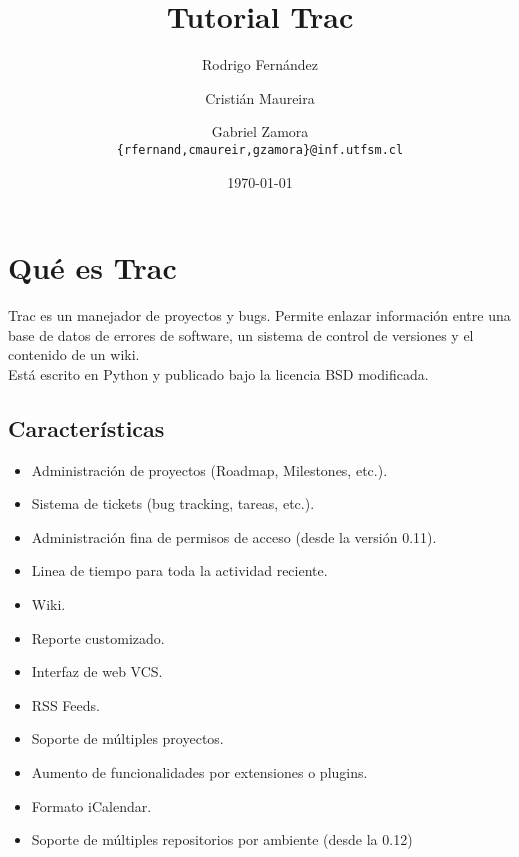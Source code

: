 \documentclass[letter, 10pt]{article}
\begin{document}
\title{Tutorial Trac}
\author{Rodrigo Fernández \and Cristián Maureira \and Gabriel Zamora\\ \small{\texttt{\{rfernand,cmaureir,gzamora\}@inf.utfsm.cl}}}
\date{\today}

\maketitle

\section{Qué es Trac}
Trac es un manejador de proyectos y bugs.
Permite enlazar información entre una base de datos de errores de software, un sistema de control de versiones y el contenido de un wiki.\\
Está escrito en Python y publicado bajo la licencia BSD modificada.

\subsection{Características}
\begin{itemize}
    \item Administración de proyectos (Roadmap, Milestones, etc.).
    \item Sistema de tickets (bug tracking, tareas, etc.).
    \item Administración fina de permisos de acceso (desde la versión 0.11).
    \item Linea de tiempo para toda la actividad reciente.
    \item Wiki.
    \item Reporte customizado.
    \item Interfaz de web VCS.
    \item RSS Feeds.
    \item Soporte de múltiples proyectos.
    \item Aumento de funcionalidades por extensiones o plugins.
    \item Formato iCalendar.
    \item Soporte de múltiples repositorios por ambiente (desde la 0.12)
\end{itemize}
\end{document}
